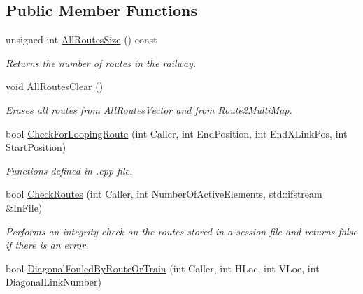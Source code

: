 \subsection*{Public Member Functions}
\begin{DoxyCompactItemize}
\item 
\mbox{\label{class_t_all_routes_a438b71f3afbc2c8adb45b47f69cb3bb9}} 
unsigned int \mbox{\hyperlink{class_t_all_routes_a438b71f3afbc2c8adb45b47f69cb3bb9}{All\+Routes\+Size}} () const
\begin{DoxyCompactList}\small\item\em Returns the number of routes in the railway. \end{DoxyCompactList}\item 
\mbox{\label{class_t_all_routes_a30042b2492dc00cec8e5cba68c446efb}} 
void \mbox{\hyperlink{class_t_all_routes_a30042b2492dc00cec8e5cba68c446efb}{All\+Routes\+Clear}} ()
\begin{DoxyCompactList}\small\item\em Erases all routes from All\+Routes\+Vector and from Route2\+Multi\+Map. \end{DoxyCompactList}\item 
\mbox{\label{class_t_all_routes_a12eedbd538ea1c2d3f204e5f2f62e1cd}} 
bool \mbox{\hyperlink{class_t_all_routes_a12eedbd538ea1c2d3f204e5f2f62e1cd}{Check\+For\+Looping\+Route}} (int Caller, int End\+Position, int End\+X\+Link\+Pos, int Start\+Position)
\begin{DoxyCompactList}\small\item\em Functions defined in .cpp file. \end{DoxyCompactList}\item 
\mbox{\label{class_t_all_routes_ad151a9c7a0ad304f0f5c5c6b523ffb2e}} 
bool \mbox{\hyperlink{class_t_all_routes_ad151a9c7a0ad304f0f5c5c6b523ffb2e}{Check\+Routes}} (int Caller, int Number\+Of\+Active\+Elements, std\+::ifstream \&In\+File)
\begin{DoxyCompactList}\small\item\em Performs an integrity check on the routes stored in a session file and returns false if there is an error. \end{DoxyCompactList}\item 
bool \mbox{\hyperlink{class_t_all_routes_a2341a7e860e716e60b733f45814e4499}{Diagonal\+Fouled\+By\+Route\+Or\+Train}} (int Caller, int H\+Loc, int V\+Loc, int Diagonal\+Link\+Number)

\end{DoxyCompactItemize}
